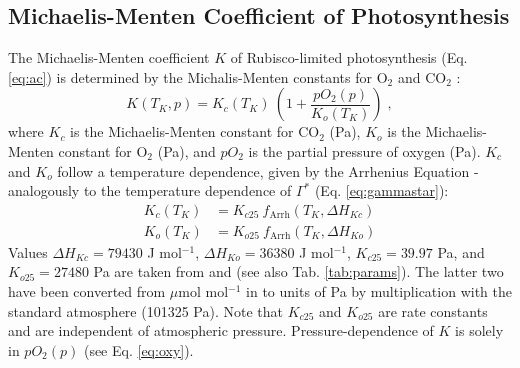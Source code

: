 \documentclass{myreport}
\begin{document}
\subsection{Michaelis-Menten Coefficient of Photosynthesis}
\label{sec:kmm}
The Michaelis-Menten coefficient $K$ of Rubisco-limited photosynthesis (Eq. \ref{eq:ac}) is determined by the Michalis-Menten constants for O$_2$ and CO$_2$ \citep{farquhar80}:
\begin{equation}
\label{eq:michaelis}
	K(T_K, p) = K_c(T_K)\: \left( 1 + \frac{pO_2(p)}{K_o(T_K)} \right) \;,
\end{equation}
where $K_c$ is the Michaelis-Menten constant for CO$_2$ (Pa), $K_o$ is the Michaelis-Menten constant for O$_2$ (Pa), and $pO_2$ is the partial pressure of oxygen (Pa). $K_c$ and $K_o$ follow a temperature dependence, given by the Arrhenius Equation - analogously to the temperature dependence of $\Gamma^\ast$ (Eq. \ref{eq:gammastar}):
\begin{subequations}
\label{eq:kcko}
\begin{align}
	K_c(T_K)& = K_{c25}\: f_{\text{Arrh}}(T_K, \Delta H_{Kc}) \label{eq:kc} \\
    K_o(T_K)& = K_{o25}\: f_{\text{Arrh}}(T_K, \Delta H_{Ko}) \label{eq:ko}
\end{align}
\end{subequations}
Values $\Delta H_{Kc} = 79430$ J mol$^{-1}$, $\Delta H_{Ko} = 36380$ J mol$^{-1}$, $K_{c25} = 39.97$ Pa, and $K_{o25} = 27480$ Pa are taken from \cite{bernacchi01} and (see also Tab. \ref{tab:params}). The latter two have been converted from $\mu$mol mol$^{-1}$ in \cite{bernacchi01} to units of Pa by multiplication with the standard atmosphere (101325 Pa). Note that $K_{c25}$ and $K_{o25}$ are rate constants and are independent of atmospheric pressure. Pressure-dependence of $K$ is solely in $pO_2(p)$ (see Eq. \ref{eq:oxy}).

\end{document}
